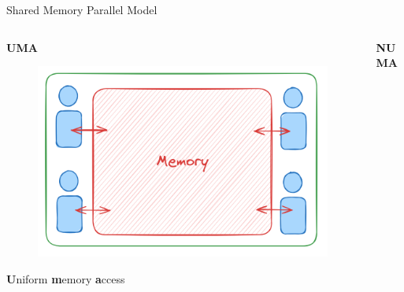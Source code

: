 \begin{frame}{Shared Memory Parallel Model}
  \begin{columns}
    \begin{column}{0.35\textwidth}
      \centering \textbf{UMA}
      \begin{figure}
        \centering
        \includegraphics[width=\textwidth]{day8_am/img/UMA.png}
      \end{figure}
      \centering \textbf{U}niform \textbf{m}emory \textbf{a}ccess
    \end{column}
    \begin{column}{0.35\textwidth}
      \centering \textbf{NUMA}
      \begin{figure}
        \centering

\end{figure}
\end{column}
\end{columns}
\end{frame}
